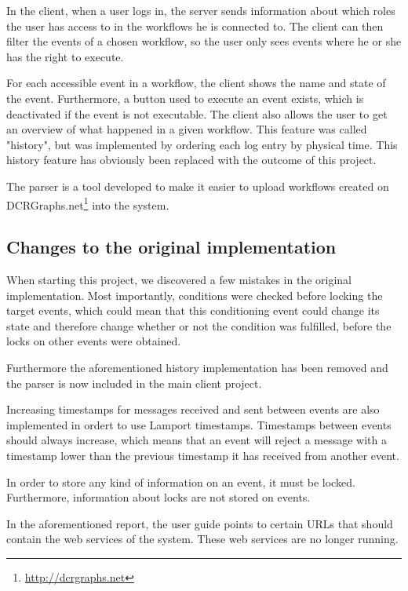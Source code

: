 		\newpar In the client, when a user logs in, the server sends information about which roles the user has access to in the workflows he is connected to. The client can then filter the events of a chosen workflow, so the user only sees events where he or she has the right to execute.
		
		For each accessible event in a workflow, the client shows the name and state of the event. Furthermore, a button used to execute an event exists, which is deactivated if the event is not executable. The client also allows the user to get an overview of what happened in a given workflow. This feature was called "history", but was implemented by ordering each log entry by physical time. This history feature has obviously been replaced with the outcome of this project.
		
		\newpar The parser is a tool developed to make it easier to upload workflows created on DCRGraphs.net\footnote{\url{http://dcrgraphs.net}} into the system.
		
		\subsection{Changes to the original implementation}
			When starting this project, we discovered a few mistakes in the original implementation. Most importantly, conditions were checked before locking the target events, which could mean that this conditioning event could change its state and therefore change whether or not the condition was fulfilled, before the locks on other events were obtained.
            
            Furthermore the aforementioned history implementation has been removed and the parser is now included in the main client project.
            
            \newpar Increasing timestamps for messages received and sent between events are also implemented in ordert to use Lamport timestamps. Timestamps between events should always increase, which means that an event will reject a message with a timestamp lower than the previous timestamp it has received from another event.
            
            \newpar In order to store any kind of information on an event, it must be locked. Furthermore, information about locks are not stored on events.

			\newpar In the aforementioned report, the user guide points to certain URLs that should contain the web services of the system. These web services are no longer running.